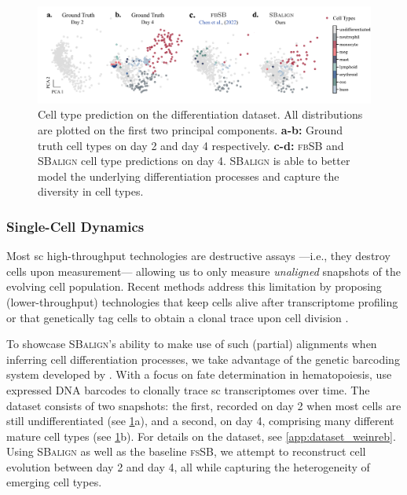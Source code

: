 \begin{figure}[t]
    \centering
    \includegraphics[width=\textwidth]{figures/fig_cell_pred_types.pdf}
    \caption{Cell type prediction on the differentiation dataset. All distributions are plotted on the first two principal components. \textbf{a-b:} Ground truth cell types on day 2 and day 4 respectively. \textbf{c-d:} \textsc{fbSB} and \textsc{SBalign} cell type predictions on day 4. \textsc{SBalign} is able to better model the underlying differentiation processes and capture the diversity in cell types.}
    \label{fig:results_cell_class}
\end{figure}

\subsubsection{Single-Cell Dynamics}
\label{sec:sbalign_cell}

Most \acrlong{sc} high-throughput technologies are destructive assays ---i.e., they destroy cells upon measurement--- allowing us to only measure \textit{unaligned} snapshots of the evolving cell population. Recent methods address this limitation by proposing (lower-throughput) technologies that keep cells alive after transcriptome profiling \citep{chen2022live} or that genetically tag cells to obtain a clonal trace upon cell division \citep{weinreb2020lineage}.

To showcase \textsc{SBalign}'s ability to make use of such (partial) alignments when inferring cell differentiation processes, we take advantage of the genetic barcoding system developed by \citet{weinreb2020lineage}. With a focus on fate determination in hematopoiesis, \citet{weinreb2020lineage} use expressed \acrshort{DNA} barcodes to clonally trace \acrlong{sc} transcriptomes over time. The dataset consists of two snapshots: the first, recorded on day 2 when most cells are still undifferentiated (see \cref{fig:results_cell_class}a), and a second, on day 4, comprising many different mature cell types (see \cref{fig:results_cell_class}b). For details on the dataset, see \cref{app:dataset_weinreb}. Using \textsc{SBalign} as well as the baseline \textsc{fsSB}, we attempt to reconstruct cell evolution between day 2 and day 4, all while capturing the heterogeneity of emerging cell types.

